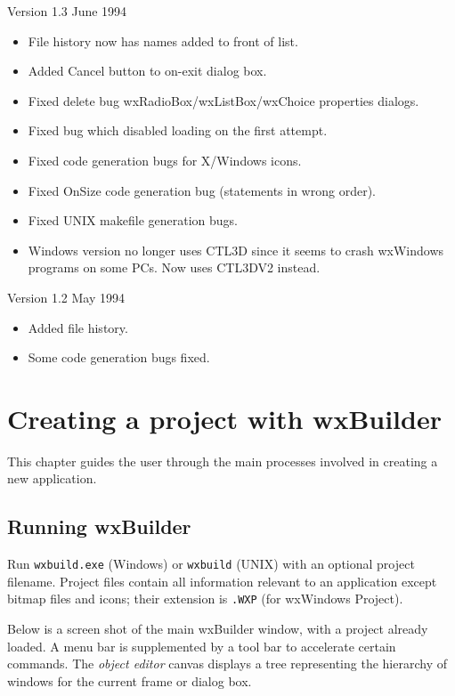 Version 1.3 June 1994

\begin{itemize}\itemsep=0pt
\item File history now has names added to front of list.
\item Added Cancel button to on-exit dialog box.
\item Fixed delete bug wxRadioBox/wxListBox/wxChoice properties
dialogs.
\item Fixed bug which disabled loading on the first attempt.
\item Fixed code generation bugs for X/Windows icons.
\item Fixed OnSize code generation bug (statements in wrong order).
\item Fixed UNIX makefile generation bugs.
\item Windows version no longer uses CTL3D since it seems to
crash wxWindows programs on some PCs. Now uses CTL3DV2 instead.
\end{itemize}

Version 1.2 May 1994

\begin{itemize}\itemsep=0pt
\item Added file history.
\item Some code generation bugs fixed.
\end{itemize}

\chapter{Creating a project with wxBuilder}%
%
\setfooter{\thepage}{}{}{}{}{\thepage}%

This chapter guides the user through the main processes involved
in creating a new application.

\section{Running wxBuilder}

Run {\tt wxbuild.exe} (Windows) or {\tt wxbuild} (UNIX) with an optional
project filename. Project files contain all information relevant to an
application except bitmap files and icons; their extension is {\tt .WXP}
\rtfsp(for wxWindows Project).

Below is a screen shot of the main wxBuilder window, with a project
already loaded. A menu bar is supplemented by a tool bar to accelerate
certain commands. The {\it object editor} canvas displays a
tree representing the hierarchy of windows for the current frame or
dialog box.


